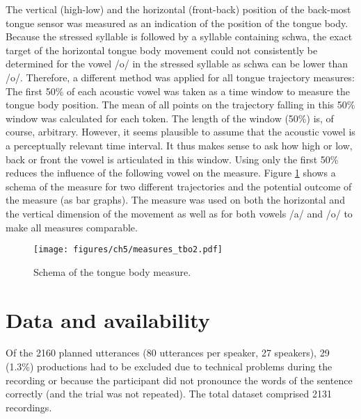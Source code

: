The vertical (high-low) and the horizontal (front-back) position of the back-most tongue sensor was measured as an indication of the position of the tongue body. Because the stressed syllable is followed by a syllable containing schwa, the exact target of the horizontal tongue body movement could not consistently be determined for the vowel /o/ in the stressed syllable as schwa can be lower than /o/. Therefore, a different method was applied for all tongue trajectory measures: The first 50\% of each acoustic vowel was taken as a time window to measure the tongue body position. The mean of all points on the trajectory falling in this 50\% window was calculated for each token. The length of the window (50\%) is, of course, arbitrary. However, it seems plausible to assume that the acoustic vowel is a perceptually relevant time interval. It thus makes sense to ask how high or low, back or front the vowel is articulated in this window. Using only the first 50\% reduces the influence of the following vowel on the measure. Figure \ref{fig:tounge_measure} shows a schema of the measure for two different trajectories and the potential outcome of the measure (as bar graphs). The measure was used on both the horizontal and the vertical dimension of the movement as well as for both vowels /a/ and /o/ to make all measures comparable.

\begin{figure}
\texttt{[image: figures/ch5/measures\_tbo2.pdf]}
\caption{Schema of the tongue body measure.}
\label{fig:tounge_measure}
\end{figure}

\section{Data and availability}

Of the 2160 planned utterances (80 utterances per speaker, 27 speakers), 29 (1.3\%) productions had to be excluded due to technical problems during the recording or because the participant did not pronounce the words of the sentence correctly (and the trial was not repeated). The total dataset comprised 2131 recordings. 

